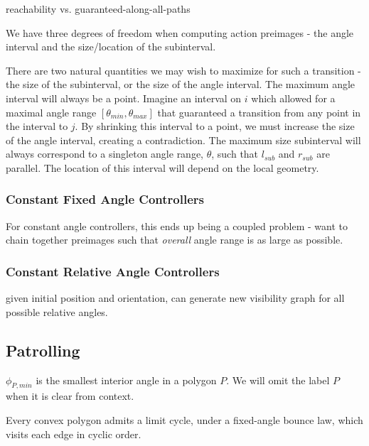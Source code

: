 \documentclass[]{styles/svproc}  %
\begin{document}
reachability vs. guaranteed-along-all-paths

We have three degrees of freedom when computing action preimages - the angle
interval and the size/location of the subinterval.

There are two natural quantities we may wish to maximize for such a transition -
the size of the subinterval, or the size of the angle interval.
The maximum angle interval will always be a point. Imagine an interval on $i$
which allowed for a maximal angle range $[\theta_{min}, \theta_{max}]$ that
guaranteed a transition from any point in the interval to $j$. By
shrinking this interval to a point, we must increase the size of the angle
interval, creating a contradiction. The maximum size subinterval will always correspond to a singleton angle range,
$\theta$, such that $l_{sub}$ and $r_{sub}$ are parallel. The location of this
interval will depend on the local geometry.


\subsubsection{Constant Fixed Angle Controllers}

For constant angle controllers, this
ends up being a coupled problem - want to chain together preimages such that
\emph{overall} angle range is as large as possible.

\subsubsection{Constant Relative Angle Controllers}

given initial position and orientation, can generate new visibility graph for
all possible relative angles.

\subsection{Patrolling \label{sec:cycles}}

\begin{definition}
$\phi_{P,min}$ is the smallest interior angle in a polygon $P$. We will omit the
label $P$ when it is clear from context.
\end{definition}

\begin{proposition}
Every convex polygon admits a limit cycle, under a fixed-angle bounce law, 
which visits each edge in cyclic order.
\end{proposition}
\end{document}
